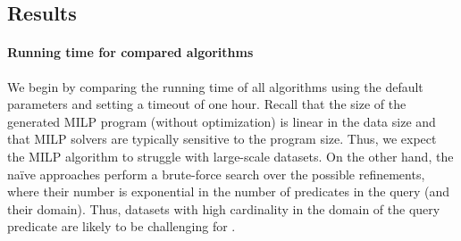 
\subsection{Results}\label{sec:results}

\paragraph*{Running time for compared algorithms}
We begin by comparing the running time of all algorithms using the default parameters and setting a timeout of one hour. 
Recall that the size of the generated MILP program (without optimization) is linear in the data size and that MILP solvers are typically sensitive to the program size. Thus, we expect the MILP algorithm to struggle with large-scale datasets. On the other hand, the na\"{i}ve approaches perform a brute-force search over the possible refinements, where their number is exponential in the number of predicates in the query (and their domain). Thus, datasets with high cardinality in the domain of the query predicate are likely to be challenging for .  

